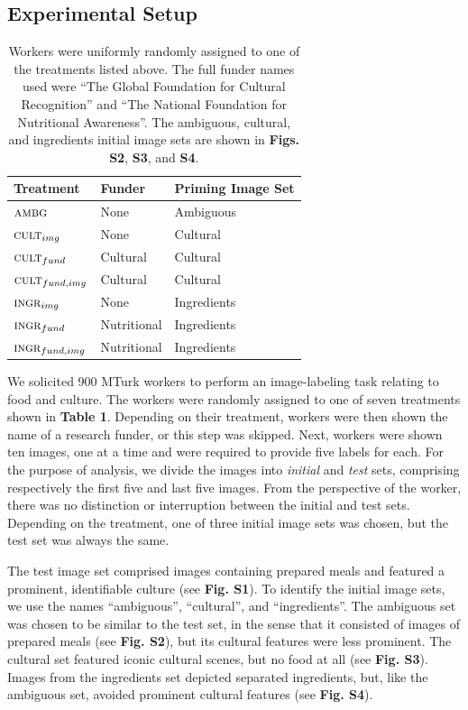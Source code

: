 \documentclass[letterpaper]{article}
\begin{document}
\subsection*{Experimental Setup}
\begin{table}[t]
\centering
	\begin{tabular}{ l  l  l }
		\hline                       
		Treatment & Funder & Priming Image Set	\\ 
		\hline                       
		$\textsc{ambg}$ & None & Ambiguous\\
		$\textsc{cult}_{img}$ & None & Cultural\\
		$\textsc{cult}_{fund}$ & Cultural & Cultural\\
		$\textsc{cult}_{fund,img}$ & Cultural & Cultural\\
		$\textsc{ingr}_{img}$ & None & Ingredients\\
		$\textsc{ingr}_{fund}$ & Nutritional & Ingredients\\
		$\textsc{ingr}_{fund, img}$ & Nutritional & Ingredients\\
		\hline  
	\end{tabular}


	\caption{ \footnotesize{ 
		Workers were uniformly randomly assigned to one of the 
		treatments listed above. 
		The full funder names used were 
		``The Global Foundation for Cultural Recognition'' and 
		``The National Foundation for Nutritional Awareness''.  
		The ambiguous, cultural, and ingredients initial image sets are shown 
		in \textbf{Figs. S2}, \textbf{S3}, and \textbf{S4}.
	}}
	\label{table:1}
\end{table}
We solicited 900 MTurk workers to perform an image-labeling task relating to
food and culture.  The workers were randomly assigned to one of seven 
treatments shown in \textbf{Table 1}.  Depending on their treatment, workers were then shown the 
name of a research funder, or this step was skipped.
Next, workers were shown ten images, one at a time and were required to provide
five labels for each.  For the purpose of analysis, we divide the images
into \textit{initial} and \textit{test} sets, comprising respectively the 
first five and last five images.  From the perspective of the worker, there 
was no distinction or interruption between the initial and test sets. 
Depending on the treatment, one of three initial image sets was chosen, but
the test set was always the same.

The test image set comprised images containing prepared meals and featured a 
prominent, identifiable culture (see \textbf{Fig. S1}).
To identify the initial image sets, we use the names ``ambiguous'', 
``cultural'', and ``ingredients''.  The ambiguous set was chosen to
be similar to the test set, in the sense that it consisted of
images of prepared meals (see \textbf{Fig. S2}),  but its cultural 
features were less prominent.  The cultural set featured 
iconic cultural scenes, but no food at all (see \textbf{Fig. S3}).  Images from 
the ingredients set depicted separated ingredients, but, 
like the ambiguous set, avoided prominent cultural features (see 
\textbf{Fig. S4}).
\end{document}
